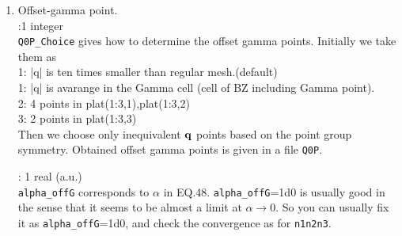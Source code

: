 \documentclass[a4paper,10pt,epsf,fleqn]{article}
\newcommand{\keyw}[1]{\fbox{\tt #1}}
\begin{document}
{\begin{enumerate}
{\tt deltaw} is the interval for the numerical derivative
$\frac{\partial \Sigma(\omega)}{\partial \omega}$ in EQ.8.
We calculate $\langle \psi^{{\bf k}n} |\Sigma(\epsilon^{{\bf k}n}+{\tt deltaw}) |\psi^{{\bf k}n} \rangle$ 
and $\langle \psi^{{\bf k}n} |\Sigma(\psi^{{\bf k}n}\!-\!{\tt deltaw})|\psi^{{\bf k}n} \rangle$
in addition to $\langle \psi^{{\bf k}n} |\Sigma(\epsilon^{{\bf k}n})|\psi^{{\bf k}n} \rangle$.
From these values, we can calcuate two $Z$ (or second-derivative of $\Sigma(\omega)$), as shown
in {\sf SECU}. It will help to see whether the used \verb#deltaw# is O.K. or not.

\item Offset-gamma point.\\
\keyw{Q0PChoice 0}:1 integer\\
{\tt Q0P\_Choice} gives how to determine the offset gamma points.
Initially we take them as\\
1: |q| is ten times smaller than regular mesh.(default)\\
1: |q| is avarange in the Gamma cell (cell of BZ including Gamma point). \\
2: 4 points in plat(1:3,1),plat(1:3,2)\\
3: 2 points in plat(1:3,3)\\
Then we choose only inequivalent ${\bf q}$ points
based on the point group symmetry.
Obtained offset gamma points is given in a file {\tt Q0P}.

\keyw{alpha\_offG}: 1 real (a.u.) \\
{\tt alpha\_offG} corresponds to $\alpha$ in EQ.48.
{\tt alpha\_offG}=1d0 is usually good in the sense that
it seems to be almost a limit at $\alpha \to 0$.
So you can usually fix it as {\tt alpha\_offG}=1d0, and check the
convergence as for {\tt n1n2n3}.




\end{enumerate}}
\end{document}
